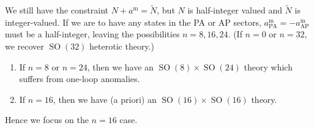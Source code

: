 \documentclass{report}
\theoremstyle{plain}
\theoremstyle{definition}
\theoremstyle{remark}
\DeclareMathOperator{\SO}{SO}
\begin{document}
We still have the constraint $N + a^{\text{m}} = \tilde{N}$, but $N$
is half-integer valued and $\tilde{N}$ is integer-valued. If we are to
have any states in the PA or AP sectors, $a^{\text{m}}_{\text{PA}} =
-a^{\text{m}}_{\text{AP}}$ must be a half-integer, leaving the
possibilities $n = 8, 16, 24$. (If $n = 0$ or $n = 32$, we recover
$\SO(32)$ heterotic theory.)
\begin{enumerate}
\item If $n = 8$ or $n = 24$, then we have an $\SO(8) \times \SO(24)$
  theory which suffers from one-loop anomalies.
\item If $n = 16$, then we have (a priori) an $\SO(16) \times \SO(16)$
  theory.
\end{enumerate}
Hence we focus on the $n = 16$ case.
\end{document}
